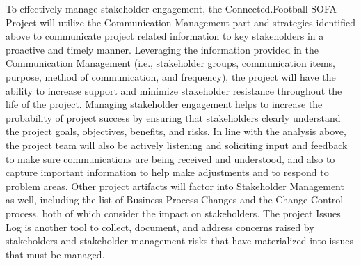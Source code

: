 To effectively manage stakeholder engagement, the Connected.Football SOFA Project will utilize the Communication Management part and strategies identified above to communicate project related information to key stakeholders in a proactive and timely manner.  Leveraging the information provided in the Communication Management (i.e., stakeholder groups, communication items, purpose, method of communication, and frequency), the project will have the ability to increase support and minimize stakeholder resistance throughout the life of the project.  Managing stakeholder engagement helps to increase the probability of project success by ensuring that stakeholders clearly understand the project goals, objectives, benefits, and risks. 
\newline
In line with the analysis above, the project team will also be actively listening and soliciting input and feedback to make sure communications are being received and understood, and also to capture important information to help make adjustments and to respond to problem areas.
\newline
Other project artifacts will factor into Stakeholder Management as well, including the list of Business Process Changes and the Change Control process, both of which consider the impact on stakeholders.  The project Issues Log is another tool to collect, document, and address concerns raised by stakeholders and stakeholder management risks that have materialized into issues that must be managed.

